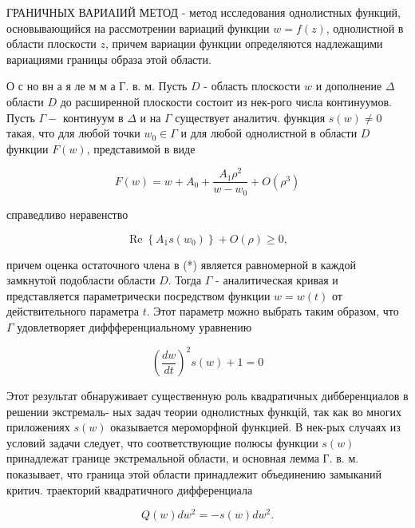 \documentclass[10pt]{article}
\begin{document}
ГРАНИЧНЫХ ВАРИАІИЙ МЕТОД - метод исследования однолистных функций, основывающийся на рассмотрении вариаций функции $w=f(z)$, однолистной в области плоскости $z$, причем вариации функции определяются надлежащими вариациями границы образа этой области.



О с но вн а я ле м м а $Г$. в. м. Пусть $D$ - область плоскости $w$ и дополнение $\Delta$ области $D$ до расширенной плоскости состоит из нек-рого числа континуумов. Пусть $\Gamma-$ континуум в $\Delta$ и на $\Gamma$ существует аналитич. функция $s(w) \neq 0$ такая, что для любой точки $w_{0} \in \Gamma$ и для любой однолистной в области $D$ функции $F(w)$, представимой в виде



\[

F(w)=w+A_{0}+\frac{A_{1} \rho^{2}}{w-w_{0}}+O\left(\rho^{3}\right)

\]



справедливо неравенство



\[

\operatorname{Re}\left\{A_{1} s\left(w_{0}\right)\right\}+O(\rho) \geqslant 0,

\]



причем оценка остаточного члена в (*) является равномерной в каждой замкнутой подобласти области $D$. Тогда $\Gamma$ - аналитическая кривая и представляется параметрически посредством функции $w=w(t)$ от действительного параметра $t$. Этот параметр можно выбрать таким образом, что $\Gamma$ удовлетворяет диффференциальному уравнению



\[

\left(\frac{d w}{d t}\right)^{2} s(w)+1=0

\]



Этот результат обнаруживает существенную роль квадратичных дибберенциалов в решении экстремаль- ных задач теории однолистных функцій, так как во многих приложениях $s(w)$ оказывается мероморфной функцией. В нек-рых случаях из условий задачи следует, что соответствующие полюсы функции $s(w)$ принадлежат границе экстремальной области, и основная лемма $Г$. в. м. показывает, что граница этой области принадлежит объединению замыканий критич. траекторий квадратичного дифференциала



\[

Q(w) d w^{2}=-s(w) d w^{2} .

\]
\end{document}
